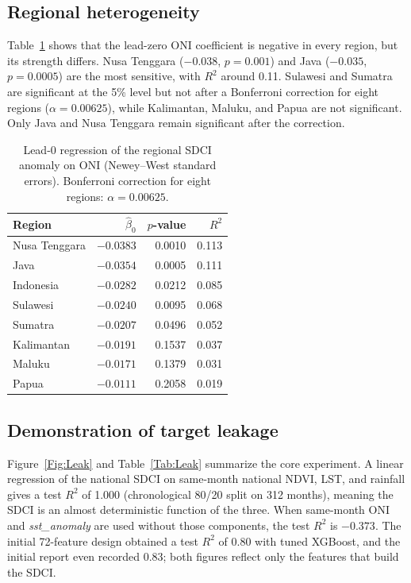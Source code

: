 \documentclass[11pt,twoside]{article}
\begin{document}
\subsection{Regional heterogeneity}
\label{SubSec:Regions}

Table~\ref{Tab:Regions} shows that the lead-zero ONI coefficient is negative in every region, but its strength differs. Nusa Tenggara ($-0.038$, $p = 0.001$) and Java ($-0.035$, $p = 0.0005$) are the most sensitive, with $R^2$ around 0.11. Sulawesi and Sumatra are significant at the 5\% level but not after a Bonferroni correction for eight regions ($\alpha = 0.00625$), while Kalimantan, Maluku, and Papua are not significant. Only Java and Nusa Tenggara remain significant after the correction.

\begin{table}[ht]
\centering
\caption{Lead-0 regression of the regional SDCI anomaly on ONI (Newey--West standard errors). Bonferroni correction for eight regions: $\alpha = 0.00625$.}
\label{Tab:Regions}
\small
\begin{tabular}{lrrr}
\toprule
Region & $\hat\beta_0$ & $p$-value & $R^2$ \\
\midrule
Nusa Tenggara & $-0.0383$ & 0.0010 & 0.113 \\
Java          & $-0.0354$ & 0.0005 & 0.111 \\
Indonesia     & $-0.0282$ & 0.0212 & 0.085 \\
Sulawesi      & $-0.0240$ & 0.0095 & 0.068 \\
Sumatra       & $-0.0207$ & 0.0496 & 0.052 \\
Kalimantan    & $-0.0191$ & 0.1537 & 0.037 \\
Maluku        & $-0.0171$ & 0.1379 & 0.031 \\
Papua         & $-0.0111$ & 0.2058 & 0.019 \\
\bottomrule
\end{tabular}
\end{table}

\subsection{Demonstration of target leakage}
\label{SubSec:Leak}

Figure~\ref{Fig:Leak} and Table~\ref{Tab:Leak} summarize the core experiment. A linear regression of the national SDCI on same-month national NDVI, LST, and rainfall gives a test $R^2$ of 1.000 (chronological 80/20 split on 312 months), meaning the SDCI is an almost deterministic function of the three. When same-month ONI and \textit{sst\_anomaly} are used without those components, the test $R^2$ is $-0.373$. The initial 72-feature design obtained a test $R^2$ of 0.80 with tuned XGBoost, and the initial report even recorded 0.83; both figures reflect only the features that build the SDCI.
\end{document}
